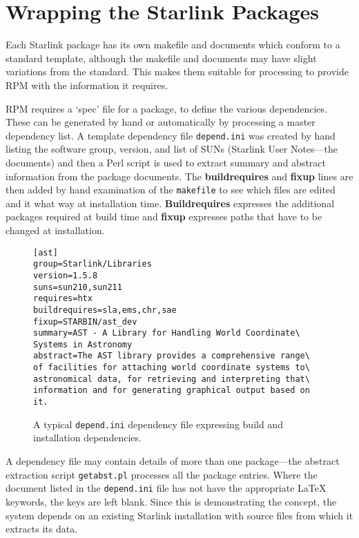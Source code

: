 \section{Wrapping the Starlink Packages}

Each Starlink package has its own makefile and documents which conform
to a standard template, although the makefile and documents may have
slight variations from the standard.  This makes them suitable for
processing to provide RPM with the information it requires.

RPM requires a `spec' file for a package, to define the various
dependencies.  These can be generated by hand or automatically by
processing a master dependency list.    A template dependency file
{\tt{depend.ini}} was created by hand listing the software group,
version, and list of SUNs (Starlink User Notes---the documents) and
then a Perl script is used to extract summary and abstract information
from the package documents.  The {\bf{buildrequires}} and {\bf{fixup}}
lines are then added by hand examination of the {\tt{makefile}} to see
which files are edited and it what way at installation time.
{\bf{Buildrequires}} expresses the additional packages required at
build time and {\bf{fixup}} expresses paths that have to be changed at
installation.

\begin{figure}
\begin{verbatim}
[ast]
group=Starlink/Libraries 
version=1.5.8 
suns=sun210,sun211 
requires=htx
buildrequires=sla,ems,chr,sae 
fixup=STARBIN/ast_dev 
summary=AST - A Library for Handling World Coordinate\
Systems in Astronomy 
abstract=The AST library provides a comprehensive range\
of facilities for attaching world coordinate systems to\
astronomical data, for retrieving and interpreting that\
information and for generating graphical output based on it.
\end{verbatim}
\caption{A typical {\tt{depend.ini}} dependency file expressing 
build and installation dependencies.}
\end{figure}

A dependency file may contain details of more than one package---the
abstract extraction script {\tt{getabst.pl}} processes all the package
entries.  Where the document listed in the {\tt{depend.ini}} file has not have
the appropriate LaTeX keywords, the keys are left blank.  Since this is 
demonstrating the concept, the system depends on an existing Starlink
installation with source files from which it extracts its data.

